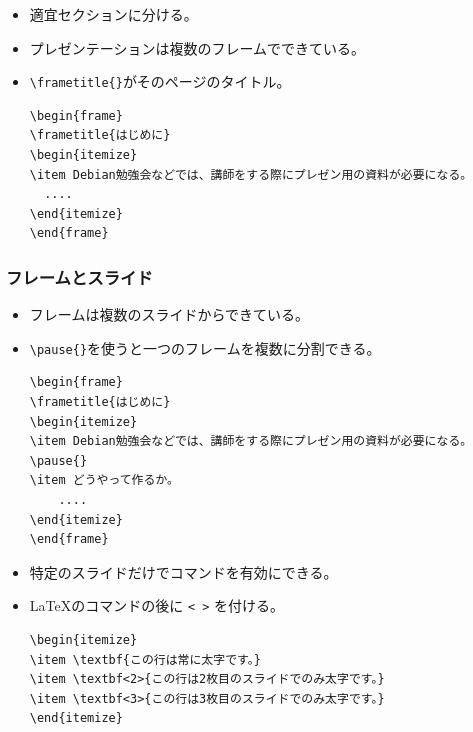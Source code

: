 \documentclass[mingoth,a4paper]{jsarticle}
\begin{document}
\begin{itemize}
\begin{screen}
\begin{verbatim}
\begin{frame}
\frametitle{目次}
\tableofcontents{}
\end{frame}
\end{verbatim}
  \end{screen}
\item 適宜セクションに分ける。
\item プレゼンテーションは複数のフレームでできている。
\item \verb|\frametitle{}|がそのページのタイトル。
  \begin{screen}
\begin{verbatim}
\begin{frame}
\frametitle{はじめに}
\begin{itemize}
\item Debian勉強会などでは、講師をする際にプレゼン用の資料が必要になる。
  ....
\end{itemize}
\end{frame}
\end{verbatim}
  \end{screen}
\end{itemize}


\subsubsection{フレームとスライド}

\begin{itemize}
\item フレームは複数のスライドからできている。
\item \verb|\pause{}|を使うと一つのフレームを複数に分割できる。
  \begin{screen}
\begin{verbatim}
\begin{frame}
\frametitle{はじめに}
\begin{itemize}
\item Debian勉強会などでは、講師をする際にプレゼン用の資料が必要になる。
\pause{}
\item どうやって作るか。
    ....
\end{itemize}
\end{frame}
\end{verbatim}
  \end{screen}
\item 特定のスライドだけでコマンドを有効にできる。
\item \LaTeX{}のコマンドの後に \verb|< >| を付ける。
  \begin{screen}
\begin{verbatim}
\begin{itemize}
\item \textbf{この行は常に太字です。}
\item \textbf<2>{この行は2枚目のスライドでのみ太字です。}
\item \textbf<3>{この行は3枚目のスライドでのみ太字です。}
\end{itemize}
\end{verbatim}
  \end{screen}
\end{itemize}
\end{document}
